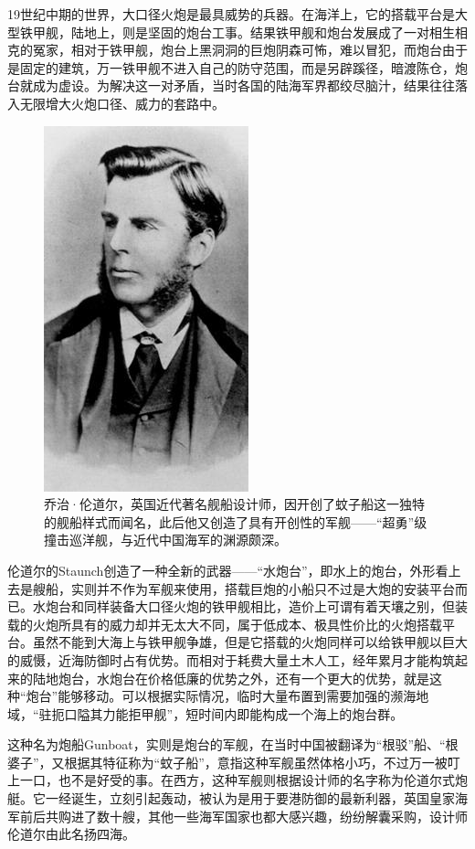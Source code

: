 \documentclass[12pt,UTF8]{ctexbook}
\begin{document}
19世纪中期的世界，大口径火炮是最具威势的兵器。在海洋上，它的搭载平台是大型铁甲舰，陆地上，则是坚固的炮台工事。结果铁甲舰和炮台发展成了一对相生相克的冤家，相对于铁甲舰，炮台上黑洞洞的巨炮阴森可怖，难以冒犯，而炮台由于是固定的建筑，万一铁甲舰不进入自己的防守范围，而是另辟蹊径，暗渡陈仓，炮台就成为虚设。为解决这一对矛盾，当时各国的陆海军界都绞尽脑汁，结果往往落入无限增大火炮口径、威力的套路中。

\begin{figure}[htbp]
	\centering
	\includegraphics[width=0.5\linewidth]{Images/5}
	\caption{乔治·伦道尔，英国近代著名舰船设计师，因开创了蚊子船这一独特的舰船样式而闻名，此后他又创造了具有开创性的军舰——“超勇”级撞击巡洋舰，与近代中国海军的渊源颇深。}
	\label{fig:1}
\end{figure}

伦道尔的Staunch创造了一种全新的武器——“水炮台”，即水上的炮台，外形看上去是艘船，实则并不作为军舰来使用，搭载巨炮的小船只不过是大炮的安装平台而已。水炮台和同样装备大口径火炮的铁甲舰相比，造价上可谓有着天壤之别，但装载的火炮所具有的威力却并无太大不同，属于低成本、极具性价比的火炮搭载平台。虽然不能到大海上与铁甲舰争雄，但是它搭载的火炮同样可以给铁甲舰以巨大的威慑，近海防御时占有优势。而相对于耗费大量土木人工，经年累月才能构筑起来的陆地炮台，水炮台在价格低廉的优势之外，还有一个更大的优势，就是这种“炮台”能够移动。可以根据实际情况，临时大量布置到需要加强的濒海地域，“驻扼口隘其力能拒甲舰”，短时间内即能构成一个海上的炮台群。

这种名为炮船Gunboat，实则是炮台的军舰，在当时中国被翻译为“根驳”船、“根婆子”，又根据其特征称为“蚊子船”，意指这种军舰虽然体格小巧，不过万一被叮上一口，也不是好受的事。在西方，这种军舰则根据设计师的名字称为伦道尔式炮艇。它一经诞生，立刻引起轰动，被认为是用于要港防御的最新利器，英国皇家海军前后共购进了数十艘，其他一些海军国家也都大感兴趣，纷纷解囊采购，设计师伦道尔由此名扬四海。
\end{document}

